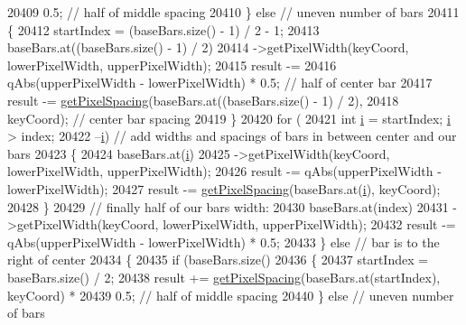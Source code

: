 \begin{DoxyCode}
20409                   0.5; \textcolor{comment}{// half of middle spacing}
20410       \} \textcolor{keywordflow}{else}           \textcolor{comment}{// uneven number of bars}
20411       \{
20412         startIndex = (baseBars.size() - 1) / 2 - 1;
20413         baseBars.at((baseBars.size() - 1) / 2)
20414             ->getPixelWidth(keyCoord, lowerPixelWidth, upperPixelWidth);
20415         result -=
20416             qAbs(upperPixelWidth - lowerPixelWidth) * 0.5; \textcolor{comment}{// half of center bar}
20417         result -= \hyperlink{class_q_c_p_bars_group_a0beccd41bc3841a4c5b284823bc7d2de}{getPixelSpacing}(baseBars.at((baseBars.size() - 1) / 2),
20418                                   keyCoord); \textcolor{comment}{// center bar spacing}
20419       \}
20420       \textcolor{keywordflow}{for} (
20421           \textcolor{keywordtype}{int} \hyperlink{_comparision_pictures_2_createtest_image_8m_a6f6ccfcf58b31cb6412107d9d5281426}{i} = startIndex; \hyperlink{_comparision_pictures_2_createtest_image_8m_a6f6ccfcf58b31cb6412107d9d5281426}{i} > index;
20422           --\hyperlink{_comparision_pictures_2_createtest_image_8m_a6f6ccfcf58b31cb6412107d9d5281426}{i}) \textcolor{comment}{// add widths and spacings of bars in between center and our bars}
20423       \{
20424         baseBars.at(\hyperlink{_comparision_pictures_2_createtest_image_8m_a6f6ccfcf58b31cb6412107d9d5281426}{i})
20425             ->getPixelWidth(keyCoord, lowerPixelWidth, upperPixelWidth);
20426         result -= qAbs(upperPixelWidth - lowerPixelWidth);
20427         result -= \hyperlink{class_q_c_p_bars_group_a0beccd41bc3841a4c5b284823bc7d2de}{getPixelSpacing}(baseBars.at(\hyperlink{_comparision_pictures_2_createtest_image_8m_a6f6ccfcf58b31cb6412107d9d5281426}{i}), keyCoord);
20428       \}
20429       \textcolor{comment}{// finally half of our bars width:}
20430       baseBars.at(index)
20431           ->getPixelWidth(keyCoord, lowerPixelWidth, upperPixelWidth);
20432       result -= qAbs(upperPixelWidth - lowerPixelWidth) * 0.5;
20433     \} \textcolor{keywordflow}{else} \textcolor{comment}{// bar is to the right of center}
20434     \{
20435       \textcolor{keywordflow}{if} (baseBars.size() %
20436       \{
20437         startIndex = baseBars.size() / 2;
20438         result += \hyperlink{class_q_c_p_bars_group_a0beccd41bc3841a4c5b284823bc7d2de}{getPixelSpacing}(baseBars.at(startIndex), keyCoord) *
20439                   0.5; \textcolor{comment}{// half of middle spacing}
20440       \} \textcolor{keywordflow}{else}           \textcolor{comment}{// uneven number of bars}

\end{DoxyCode}

